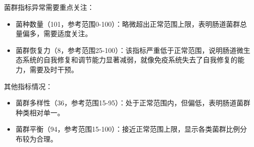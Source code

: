 \documentclass[UTF8]{ctexart}
\begin{document}
\begin{center}
\end{center}

\begin{tcolorbox}[
enhanced,
colback=gray!3,
colframe=gray!3,
arc=3mm,
boxrule=0pt,
width=\textwidth,
top=8pt,
bottom=8pt
]
{\small{\textcolor{customRed}{\faBell}}\quad 菌群指标异常需要重点关注：
\begin{itemize}
\item 菌种数量（101，参考范围0-100）：略微超出正常范围上限，表明肠道菌群总量偏多，需要适度关注。
\item 菌群恢复力（8，参考范围25-100）：该指标严重低于正常范围，说明肠道微生态系统的自我修复和调节能力显著减弱，就像免疫系统失去了自我修复的能力，需要及时干预。
\end{itemize}

{\textcolor{customGreen}{\faBell}}\quad 其他指标情况：
\begin{itemize}
\item 菌群多样性（36，参考范围15-95）：处于正常范围内，但偏低，表明肠道菌群种类相对单一。
\item 菌群平衡（94，参考范围15-100）：接近正常范围上限，显示各类菌群比例分布较为合理。
\end{itemize}
}
\end{tcolorbox}
\end{document}
